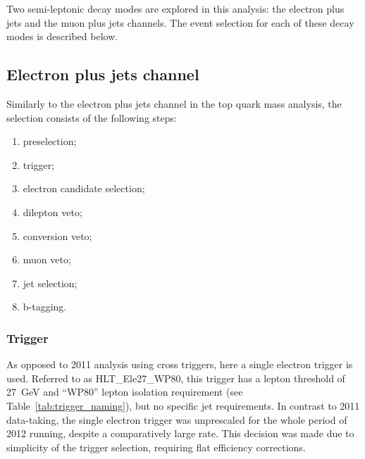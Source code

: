 Two semi-leptonic \ttbar decay modes are explored in this analysis: the electron plus jets and the muon plus jets
channels. The event selection for each of these decay modes is described below.

\subsection{Electron plus jets channel}
\label{ss_xsection:ejets}

Similarly to the electron plus jets channel in the top quark mass analysis, the selection consists of the following
steps:

\begin{enumerate}[topsep=\parskip, parsep=\parskip, itemsep=\parskip, leftmargin=\leftmargin]
	\item preselection;
	\item trigger;
	\item electron candidate selection;
	\item dilepton veto;
	\item conversion veto;
	\item muon veto;
	\item jet selection;
	\item b-tagging.
\end{enumerate}


\subsubsection*{Trigger}
As opposed to 2011 analysis using cross triggers, here a single electron trigger is used. Referred to as
HLT\_Ele27\_WP80, this trigger has a lepton \pt threshold of \SI{27}{\GeV} and ``WP80'' lepton isolation requirement
(see Table~\ref{tab:trigger_naming}), but no specific jet requirements. In contrast to 2011 data-taking, the single
electron trigger was unprescaled for the whole period of 2012 running, despite a comparatively large rate. This decision
was made due to simplicity of the trigger selection, requiring flat efficiency corrections.


